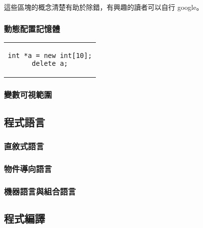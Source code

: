 \documentclass[12pt,a4paper,oneside]{report}
\begin{document}
\begin{CJK}{UTF8}{bkai}
\paragraph{}這些區塊的概念清楚有助於除錯，有興趣的讀者可以自行 google。

\subsubsection{動態配置記憶體}

\begin{code}[h!]
\centering
\begin{tabular}{c}
\begin{lstlisting}
int *a = new int[10];
delete a;
\end{lstlisting}
\end{tabular}
\end{code}

\subsubsection{變數可視範圍}

\subsection{程式語言}

\subsubsection{直敘式語言}
\subsubsection{物件導向語言}
\subsubsection{機器語言與組合語言}

\subsection{程式編譯}

\ifx \allfiles \undefined

\printindex

\clearpage
\end{CJK}
\end{document}
